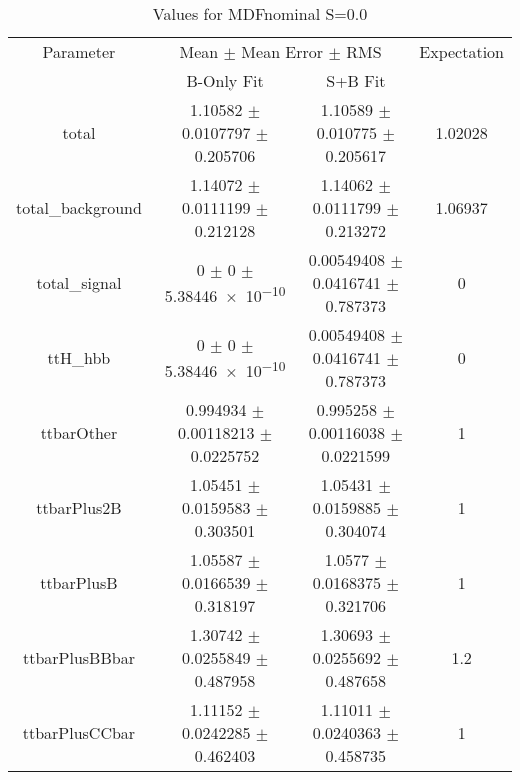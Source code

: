 \begin{table}
\centering
\caption{Values for MDFnominal S=0.0}
\begin{tabular}{cccc}
\toprule
Parameter & \multicolumn{2}{c}{Mean $\pm$ Mean Error $\pm$ RMS} & Expectation\\
 & B-Only Fit & S+B Fit & \\
\midrule
total & \num{1.10582} $\pm$ \num{0.0107797} $\pm$ \num{0.205706} & \num{1.10589} $\pm$ \num{0.010775} $\pm$ \num{0.205617} & \num{1.02028}\\
total\_background & \num{1.14072} $\pm$ \num{0.0111199} $\pm$ \num{0.212128} & \num{1.14062} $\pm$ \num{0.0111799} $\pm$ \num{0.213272} & \num{1.06937}\\
total\_signal & \num{0} $\pm$ \num{0} $\pm$ \num{5.38446e-10} & \num{0.00549408} $\pm$ \num{0.0416741} $\pm$ \num{0.787373} & \num{0}\\
ttH\_hbb & \num{0} $\pm$ \num{0} $\pm$ \num{5.38446e-10} & \num{0.00549408} $\pm$ \num{0.0416741} $\pm$ \num{0.787373} & \num{0}\\
ttbarOther & \num{0.994934} $\pm$ \num{0.00118213} $\pm$ \num{0.0225752} & \num{0.995258} $\pm$ \num{0.00116038} $\pm$ \num{0.0221599} & \num{1}\\
ttbarPlus2B & \num{1.05451} $\pm$ \num{0.0159583} $\pm$ \num{0.303501} & \num{1.05431} $\pm$ \num{0.0159885} $\pm$ \num{0.304074} & \num{1}\\
ttbarPlusB & \num{1.05587} $\pm$ \num{0.0166539} $\pm$ \num{0.318197} & \num{1.0577} $\pm$ \num{0.0168375} $\pm$ \num{0.321706} & \num{1}\\
ttbarPlusBBbar & \num{1.30742} $\pm$ \num{0.0255849} $\pm$ \num{0.487958} & \num{1.30693} $\pm$ \num{0.0255692} $\pm$ \num{0.487658} & \num{1.2}\\
ttbarPlusCCbar & \num{1.11152} $\pm$ \num{0.0242285} $\pm$ \num{0.462403} & \num{1.11011} $\pm$ \num{0.0240363} $\pm$ \num{0.458735} & \num{1}\\
\bottomrule
\end{tabular}
\end{table}